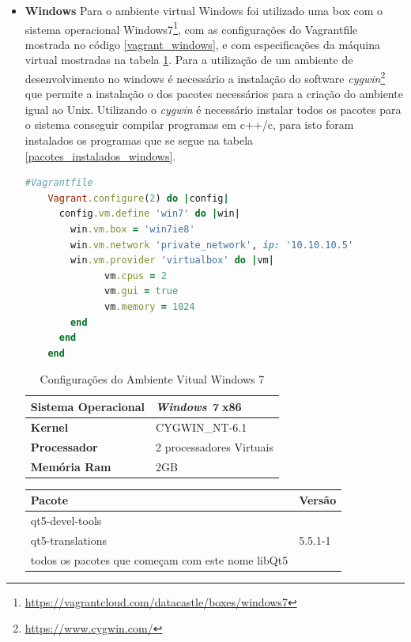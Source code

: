 \begin{itemize}
    \item \textbf{Windows}
        \subitem Para o ambiente virtual Windows foi utilizado uma box com
 o sistema operacional Windows7\footnote{\url{https://vagrantcloud.com/datacastle/boxes/windows7}},
 com as configurações do Vagrantfile mostrada no código \ref{vagrant_windows},
 e com especificações da máquina virtual mostradas na tabela \ref{especificacoes_windows}.
 Para a utilização de um ambiente de desenvolvimento no windows é necessário a instalação
 do software \textit{cygwin}\footnote{\url{https://www.cygwin.com/}} que permite a instalação
o dos pacotes necessários para a criação do ambiente igual ao Unix.
 Utilizando o \textit{cygwin} é necessário instalar todos os pacotes para o sistema 
conseguir compilar programas em c++/c, para isto foram instalados os programas 
que se segue na tabela \ref{pacotes_instalados_windows}.

\begin{lstlisting}[language=ruby, caption={Vagrantfile com configurações da máquina virtual Windows 7},
                  label=vagrant_windows]
    #Vagrantfile
    Vagrant.configure(2) do |config|
      config.vm.define 'win7' do |win|
        win.vm.box = 'win7ie8'
        win.vm.network 'private_network', ip: '10.10.10.5'
        win.vm.provider 'virtualbox' do |vm|
              vm.cpus = 2
              vm.gui = true
              vm.memory = 1024
        end
      end
    end
\end{lstlisting}

\begin{table}[h]
\centering
\begin{tabular}{ll}
\textbf{Sistema Operacional} & \textit{Windows 7} x86\\ \toprule
\textbf{Kernel} & CYGWIN\_NT-6.1  \\ \midrule 
\textbf{Processador} & 2 processadores Virtuais \\ \midrule
\textbf{Memória Ram} & 2GB  \\ \bottomrule 
\end{tabular} 
\caption{Configurações do Ambiente Vitual Windows 7}
\label{especificacoes_windows}
\end{table}


\begin{table}[h]
\centering
\begin{tabular}{ll}
\textbf{Pacote} & \textbf{Versão} \\ \toprule
qt5-devel-tools  &  \\ 
qt5-translations & 5.5.1-1  \\ 
todos os pacotes que começam com este nome libQt5 & \\ \midrule


\end{tabular}
\end{table}
\end{itemize}
